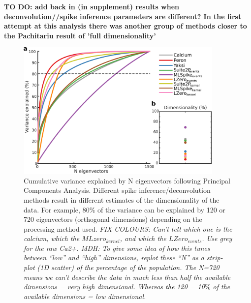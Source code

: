 \documentclass[a4paper,10pt,twocolumn]{article}
\begin{document}
\textbf{TO DO: add back in (in supplement) results when deconvolution//spike inference parameters are different? In the first attempt at this analysis there was another group of methods closer to the Pachitariu result of 'full dimensionality'}


\begin{figure}
\includegraphics[width=0.9\textwidth]{full_figs_19v2/why_deconvolve_F7_19v2.png}
\caption{\label{fig:dimensionality}Cumulative variance explained by N eigenvectors following Principal Components Analysis. Different spike inference/deconvolution methods result in different estimates of the dimensionality of the data. For example, 80$\%$ of the variance can be explained by 120 or 720 eigenvectors (orthogonal dimensions) depending on the processing method used. \emph{FIX COLOURS: Can't tell which one is the calcium, which the $MLzero_{kernel}$, and which the $LZero_{events}$. Use grey for the raw Ca2+. MDH: To give some idea of how this tunes between “low” and “high” dimensions, replot these “N” as a strip-plot (1D scatter) of the percentage of the population. The N=720 means we can’t describe the data in much less than half the available dimensions = very high dimensional. Whereas the 120 = 10$\%$ of the available dimensions = low dimensional.}}
\end{figure}




\end{document}
